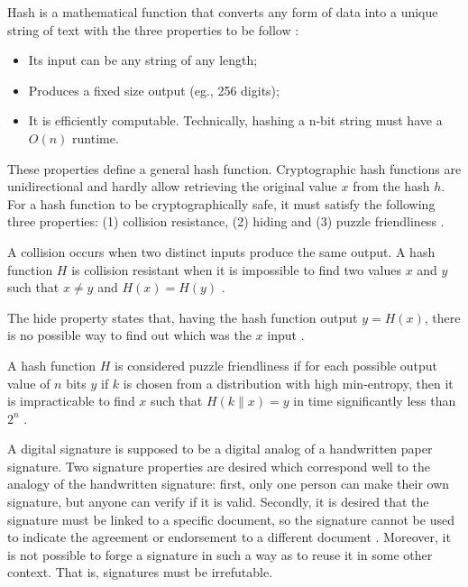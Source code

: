 \label{sec:hashesCriptograficos}
Hash is a mathematical function that converts any form of data into a unique string of text with the three properties to be follow \cite{narayanan2016bitcoin}:

\begin{itemize}
\item  Its input can be any string of any length;
\item Produces a fixed size output (eg., 256 digits);
\item It is efficiently computable. Technically, hashing a n-bit string must have a $O(n)$ runtime.
\end{itemize}

These properties define a general hash function. Cryptographic hash functions are unidirectional and hardly allow retrieving the original value $x$ from the hash $h$. For a hash function to be cryptographically safe, it must satisfy the following three properties: (1) collision resistance, (2) hiding and (3) puzzle friendliness \cite{greve2018blockchain}.

A collision occurs when two distinct inputs produce the same output. A hash function $H$ is collision resistant when it is impossible to find two values $x$ and $y$ such that $x \neq y$ and $H(x) = H(y)$ \cite{narayanan2016bitcoin}.

The hide property states that, having the hash function output $y = H (x)$, there is no possible way to find out which was the $x$ input \cite{greve2018blockchain}.

A hash function $H$ is considered puzzle friendliness if for each possible output value of $n$ bits $y$ if $k$ is chosen from a distribution with high min-entropy, then it is impracticable to find $x$ such that $H (k \| x) = y$ in time significantly less than $2^n$ \cite{narayanan2016bitcoin}.

\label{sec:assinaturasDigitais}
A digital signature is supposed to be a digital analog of a handwritten paper signature. Two signature properties are desired which correspond well to the analogy of the handwritten signature: first, only one person can make their own signature, but anyone can verify if it is valid. Secondly, it is desired that the signature must be linked to a specific document, so the signature cannot be used to indicate the agreement or endorsement to a different document \cite{merkle1989certified}. Moreover, it is not possible to forge a signature in such a way as to reuse it in some other context. That is, signatures must be irrefutable.

